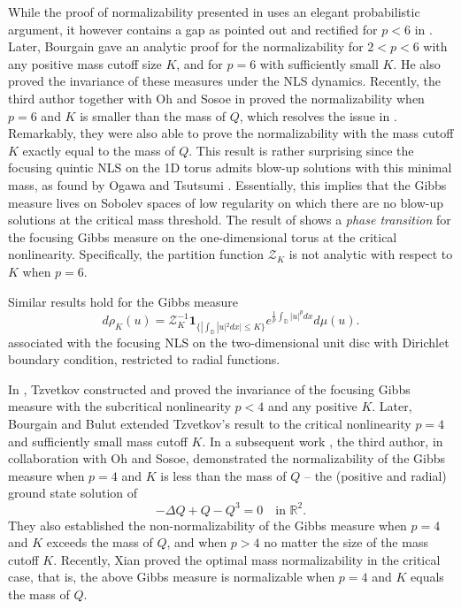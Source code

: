 \documentclass[%
11pt,  reqno]{amsart}
\theoremstyle{remarkstyle}
\newcommand{\1}{\hspace{0.2mm}\text{I}\hspace{0.2mm}}
\newcommand{\ind}{\mathbf 1}
\numberwithin{equation}{section}
\numberwithin{theorem}{section}
\begin{document}
	While the proof of normalizability presented in \cite{LRS88} uses an elegant probabilistic argument, it however contains a gap as pointed out and rectified for $p<6$ in \cite{CFL16}. Later, Bourgain \cite{BO94} gave an analytic proof for the normalizability for $2<p<6$ with any positive mass cutoff size $K$, and for $p=6$ with sufficiently small $K$. He also proved the invariance of these measures under the NLS dynamics. Recently, the third author together with Oh and Sosoe in \cite{OST22} proved the normalizability when $p=6$ and $K$ is smaller than the mass of $Q$, which resolves the issue in \cite{LRS88}. Remarkably, they were also able to prove the normalizability with the mass cutoff $K$ exactly equal to the mass of $Q$. This result is rather surprising since the focusing quintic NLS on the 1D torus admits blow-up solutions with this minimal mass, as found by Ogawa and Tsutsumi \cite{OT90}. Essentially, this implies that the Gibbs measure lives on Sobolev spaces of low regularity on which there are no blow-up solutions at the critical mass threshold. The result of \cite{OST22} shows a {\it phase transition} for the focusing Gibbs measure on the one-dimensional torus at the critical nonlinearity. Specifically, the partition function $\mathcal Z_K$ is not analytic with respect to $K$ when $p=6$.
	
	Similar results hold for the Gibbs measure
	$$
	d\rho_K(u) = \mathcal Z_K^{-1} \ind_{\{|\int_{\mathbb D} |u|^2 dx| \leq K\}} e^{\frac{1}{p}\int_{\mathbb D} |u|^p dx} d\mu(u).
	$$
	associated with the focusing NLS on the two-dimensional unit disc with Dirichlet boundary condition, restricted to radial functions. 
	
	In \cite{TZ06}, Tzvetkov constructed and proved the invariance of the focusing Gibbs measure with the subcritical nonlinearity $p<4$ and any positive $K$. Later, Bourgain and Bulut \cite{BB14} extended Tzvetkov's result to the critical nonlinearity $p=4$ and sufficiently small mass cutoff $K$. In a subsequent work \cite{OST22}, the third author, in collaboration with Oh and Sosoe, demonstrated the normalizability of the Gibbs measure when $p=4$ and $K$ is less than the mass of $Q$ -- the (positive and radial) ground state solution of 
	$$
	-\Delta Q + Q - Q^3=0 \quad \text{in } \mathbb R^2.
	$$
	They also established the non-normalizability of the Gibbs measure when $p=4$ and $K$ exceeds the mass of $Q$, and when $p>4$ no matter the size of the mass cutoff $K$. Recently, Xian \cite{XI22} proved the optimal mass normalizability in the critical case, that is, the above Gibbs measure is normalizable when $p=4$ and $K$ equals the mass of $Q$.
	
\end{document}
